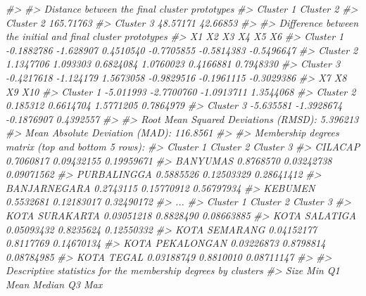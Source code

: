 \documentclass[
  oneside]{book}
\newenvironment{Shaded}{\begin{snugshade}}{\end{snugshade}}
\newcommand{\CommentTok}[1]{\textcolor[rgb]{0.56,0.35,0.01}{\textit{#1}}}
\begin{document}
\begin{Shaded}
\begin{Highlighting}[]
\CommentTok{\#\textgreater{} }
\CommentTok{\#\textgreater{} Distance between the final cluster prototypes}
\CommentTok{\#\textgreater{}           Cluster 1 Cluster 2}
\CommentTok{\#\textgreater{} Cluster 2 165.71763          }
\CommentTok{\#\textgreater{} Cluster 3  48.57171  42.66853}
\CommentTok{\#\textgreater{} }
\CommentTok{\#\textgreater{} Difference between the initial and final cluster prototypes}
\CommentTok{\#\textgreater{}                   X1        X2        X3         X4         X5         X6}
\CommentTok{\#\textgreater{} Cluster 1 {-}0.1882786 {-}1.628907 0.4510540 {-}0.7705855 {-}0.5814383 {-}0.5496647}
\CommentTok{\#\textgreater{} Cluster 2  1.1347706  1.093303 0.6824084  1.0760023  0.4166881  0.7948330}
\CommentTok{\#\textgreater{} Cluster 3 {-}0.4217618 {-}1.124179 1.5673058 {-}0.9829516 {-}0.1961115 {-}0.3029386}
\CommentTok{\#\textgreater{}                  X7         X8         X9       X10}
\CommentTok{\#\textgreater{} Cluster 1 {-}5.011993 {-}2.7700760 {-}1.0913711 1.3544068}
\CommentTok{\#\textgreater{} Cluster 2  0.185312  0.6614704  1.5771205 0.7864979}
\CommentTok{\#\textgreater{} Cluster 3 {-}5.635581 {-}1.3928674 {-}0.1876907 0.4392557}
\CommentTok{\#\textgreater{} }
\CommentTok{\#\textgreater{} Root Mean Squared Deviations (RMSD): 5.396213 }
\CommentTok{\#\textgreater{} Mean Absolute Deviation (MAD): 116.8561 }
\CommentTok{\#\textgreater{} }
\CommentTok{\#\textgreater{} Membership degrees matrix (top and bottom 5 rows): }
\CommentTok{\#\textgreater{}              Cluster 1  Cluster 2  Cluster 3}
\CommentTok{\#\textgreater{} CILACAP      0.7060817 0.09432155 0.19959671}
\CommentTok{\#\textgreater{} BANYUMAS     0.8768570 0.03242738 0.09071562}
\CommentTok{\#\textgreater{} PURBALINGGA  0.5885526 0.12503329 0.28641412}
\CommentTok{\#\textgreater{} BANJARNEGARA 0.2743115 0.15770912 0.56797934}
\CommentTok{\#\textgreater{} KEBUMEN      0.5532681 0.12183017 0.32490172}
\CommentTok{\#\textgreater{} ...}
\CommentTok{\#\textgreater{}                  Cluster 1 Cluster 2  Cluster 3}
\CommentTok{\#\textgreater{} KOTA SURAKARTA  0.03051218 0.8828490 0.08663885}
\CommentTok{\#\textgreater{} KOTA SALATIGA   0.05093432 0.8235624 0.12550332}
\CommentTok{\#\textgreater{} KOTA SEMARANG   0.04152177 0.8117769 0.14670134}
\CommentTok{\#\textgreater{} KOTA PEKALONGAN 0.03226873 0.8798814 0.08784985}
\CommentTok{\#\textgreater{} KOTA TEGAL      0.03188749 0.8810010 0.08711147}
\CommentTok{\#\textgreater{} }
\CommentTok{\#\textgreater{} Descriptive statistics for the membership degrees by clusters}
\CommentTok{\#\textgreater{}           Size       Min        Q1      Mean    Median        Q3       Max}

\end{Highlighting}
\end{Shaded}
\end{document}
